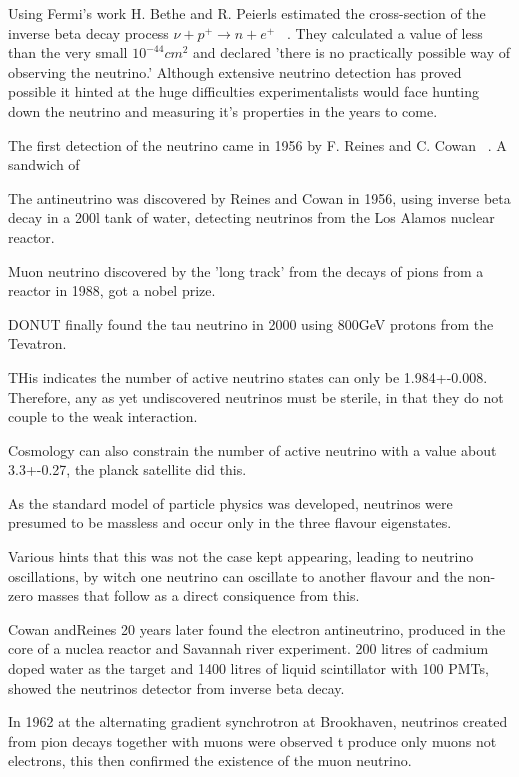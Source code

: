 Using Fermi's work H. Bethe and R. Peierls estimated the cross-section of the inverse beta decay process
${\nu} + p^{+} \rightarrow n + e^{+}$ ~\cite{bethe1934}. They calculated a value of less than the very small $10^{-44} cm^2$ and
declared 'there is no practically possible way of observing the neutrino.' Although extensive neutrino detection has proved
possible it hinted at the huge difficulties experimentalists would face hunting down the neutrino and measuring it's properties
in the years to come.

The first detection of the neutrino came in 1956 by F. Reines and C. Cowan ~\cite{cowan1956}. A sandwich of 


The antineutrino was discovered by Reines and Cowan in 1956, using inverse beta decay in a 200l tank of water, detecting neutrinos from the Los Alamos nuclear reactor.

Muon neutrino discovered by the 'long track' from the decays of pions from a reactor in 1988, got a nobel prize.

DONUT finally found the tau neutrino in 2000 using 800GeV protons from the Tevatron.

THis indicates the number of active neutrino states can only be 1.984+-0.008. Therefore, any as yet undiscovered neutrinos must be sterile, in that they do not couple to the weak interaction.

Cosmology can also constrain the number of active neutrino with a value about 3.3+-0.27, the planck satellite did this.

As the standard model of particle physics was developed, neutrinos were presumed to be massless and occur only in the three flavour eigenstates.

Various hints that this was not the case kept appearing, leading to neutrino oscillations, by witch one neutrino can oscillate to another flavour and the non-zero masses that follow as a direct consiquence from this.



Cowan andReines 20 years later found the electron antineutrino, produced in the core of a nuclea reactor and Savannah river experiment. 200 litres of cadmium doped water as the target and 1400 litres of liquid scintillator with 100 PMTs, showed the neutrinos detector from inverse beta decay.

In 1962 at the alternating gradient synchrotron at Brookhaven, neutrinos created from pion decays together with muons were observed t produce only muons not electrons, this then confirmed the existence of the muon neutrino.


